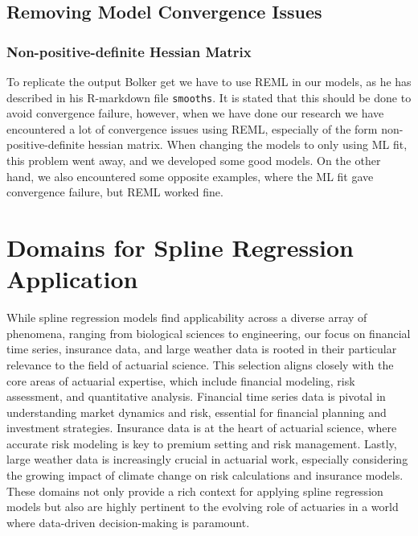 \documentclass[12pt, twoside,hidelinks]{article}
\theoremstyle{definition}
\numberwithin{equation}{section}
\begin{document}
\subsection{Removing Model Convergence Issues }


\subsubsection{Non-positive-definite Hessian Matrix}

 To replicate the output Bolker get we have to use REML in our models, as he has described in his R-markdown file \texttt{smooths}. It is stated that this should be done to avoid convergence failure, however, when we have done our research we have encountered a lot of convergence issues using REML, especially of the form non-positive-definite hessian matrix. 
 \newline
 When changing the models to only using ML fit, this problem went away, and we developed some good models. 
 \newline
 On the other hand, we also encountered some opposite examples, where the ML fit gave convergence failure, but REML worked fine.

\section{Domains for Spline Regression Application}

While spline regression models find applicability across a diverse array of phenomena, ranging from biological sciences to engineering, our focus on financial time series, insurance data, and large weather data is rooted in their particular relevance to the field of actuarial science. This selection aligns closely with the core areas of actuarial expertise, which include financial modeling, risk assessment, and quantitative analysis. Financial time series data is pivotal in understanding market dynamics and risk, essential for financial planning and investment strategies. Insurance data is at the heart of actuarial science, where accurate risk modeling is key to premium setting and risk management. Lastly, large weather data is increasingly crucial in actuarial work, especially considering the growing impact of climate change on risk calculations and insurance models. These domains not only provide a rich context for applying spline regression models but also are highly pertinent to the evolving role of actuaries in a world where data-driven decision-making is paramount.
\end{document}
